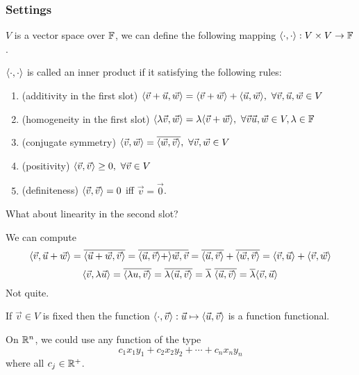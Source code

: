 \subsubsection*{Settings}
$V$ is a vector space over $\mathbb F$, we can define the following mapping $ \langle \cdot, \cdot \rangle : V \times V \to \mathbb F$.
\begin{definition}
$\langle \cdot, \cdot \rangle$ is called an inner product if it satisfying the following rules:
\begin{enumerate}
    \item(additivity in the first slot) $\langle \vec v + \vec u, \vec w \rangle = \langle \vec v + \vec w \rangle + \langle \vec u, \vec w \rangle, \ \forall \vec v, \vec u, \vec w \in V$
    \item(homogeneity in the first slot) $\langle \lambda \vec v, \vec w \rangle = \lambda \langle \vec v + \vec w \rangle, \ \forall \vec v \vec u, \vec w \in V, \lambda \in \mathbb F$
    \item(conjugate symmetry) $\langle \vec v, \vec w \rangle = \overline{\langle \vec w, \vec v \rangle}, \ \forall \vec v,\vec w \in V$
    \item(positivity) $\langle \vec v, \vec v \rangle \geq 0, \ \forall \vec v \in V$
    \item(definiteness) $\langle \vec v, \vec v \rangle = 0$ iff $\vec v = \vec 0$.
\end{enumerate}
\end{definition}
\begin{question}
What about linearity in the second slot?
\end{question}
\begin{answer} We can compute
\[ \langle \vec v, \vec u + \vec w \rangle = \overline{\langle \vec u + \vec w, \vec v\rangle} = \overline{\langle \vec u, \vec v \rangle + \rangle \vec w, \vec v} = \overline{\langle \vec u, \vec v \rangle} + \overline{\langle \vec w, \vec v\rangle } = \langle \vec v, \vec u\rangle + \langle \vec v, \vec w\rangle\]
\[ \langle \vec v, \lambda \vec u\rangle = \overline{\langle \lambda u, \vec v\rangle} = \overline{\lambda \langle \vec u,\vec v\rangle} = \overline \lambda \ \overline{\langle \vec u, \vec v\rangle} = \overline \lambda \langle \vec v, \vec u \rangle\]
Not quite. \frownie{}
\end{answer}
\begin{remark}
    If $\vec v \in V$ is fixed then the function $\langle \cdot, \vec v \rangle : \vec u \mapsto \langle \vec u, \vec v \rangle$ is a function functional. 
\end{remark}
\begin{example}
    On $\mathbb R^n$, we could use any function of the type
    \[ c_1x_1y_1 + c_2x_2y_2 + \cdots + c_nx_ny_n\] where all $c_j \in \mathbb R^+$.
\end{example}
